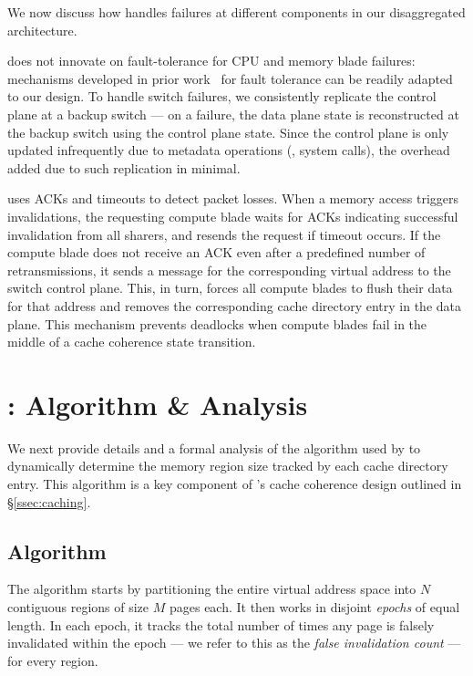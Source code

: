 We now discuss how \mind handles failures at different components in our disaggregated architecture.

 \mind does not innovate on fault-tolerance for CPU and memory blade failures: mechanisms developed in prior work~\cite{legoos, infiniswap, disaggfault} for fault tolerance can be readily adapted to our design. To handle switch failures, we consistently replicate the control plane at a backup switch --- on a failure, the data plane state is reconstructed at the backup switch using the control plane state. Since the control plane is only updated infrequently due to metadata operations (\eg, system calls), the overhead added due to such replication in minimal.

 \mind uses ACKs and timeouts to detect packet losses. When a memory access triggers invalidations, the requesting compute blade waits for ACKs indicating successful invalidation from all sharers, and resends the request if timeout occurs. If the compute blade does not receive an ACK even after a predefined number of retransmissions, it sends a  message for the corresponding virtual address to the switch control plane. This, in turn, forces all compute blades to flush their data for that address and removes the corresponding cache directory entry in the data plane. This  mechanism prevents deadlocks when compute blades fail in the middle of a cache coherence state transition.



\section{\mindAlgo: Algorithm \& Analysis}
\label{sec:algorithm}

We next provide details and a formal analysis of the \mindalgo algorithm used by \mind to dynamically determine the memory region size tracked by each cache directory entry.  This algorithm is a key component of \mind's cache coherence design outlined in \S\ref{ssec:caching}.

\subsection{Algorithm}
\label{ssec:detail}

The \mindalgo algorithm starts by partitioning the entire virtual address space into $N$ contiguous regions of size $M$ pages each. It then works in disjoint \emph{epochs} of equal length. In each epoch, it tracks the total number of times any page is falsely invalidated within the epoch  --- we refer to this as the \textit{false invalidation count} --- for every region.

